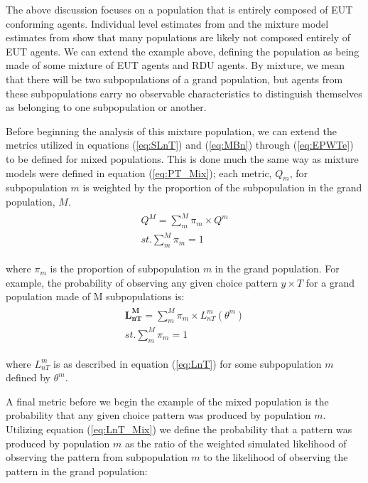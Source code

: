 \documentclass[../main.tex]{subfiles}
\begin{document}
The above discussion focuses on a population that is entirely composed of EUT conforming agents.
Individual level estimates from \textcite{Hey1994} and the mixture model estimates from \textcite{Harrison2008a} show that many populations are likely not composed entirely of EUT agents.
We can extend the example above, defining the population as being made of some mixture of EUT agents and RDU agents.
By mixture, we mean that there will be two subpopulations of a grand population, but agents from these subpopulations carry no observable characteristics to distinguish themselves as belonging to one subpopulation or another.

Before beginning the analysis of this mixture population, we can extend the metrics utilized in equations (\ref{eq:SLnT}) and (\ref{eq:MBn}) through (\ref{eq:EPWTe}) to be defined for mixed populations.
This is done much the same way as mixture models were defined in equation (\ref{eq:PT_Mix}); each metric, $Q_m$, for subpopulation $m$ is weighted by the proportion of the subpopulation in the grand population, $M$.
\begin{align}
	\label{eq:Metric_Mix}
	\begin{split}
		\bm{\mathit{Q^M}} = \sum_m^M \pi_m \times Q^m \\ 
		\mathit{st.} \sum_m^M \pi_m = 1
	\end{split}
\end{align}

\noindent where $\pi_m$ is the proportion of subpopulation $m$ in the grand population.
For example, the probability of observing any given choice pattern $y \times T$ for a grand population made of M subpopulations is:
\begin{align}
	\label{eq:LnT_Mix}
	\begin{split}
		\bm{L_{nT}^M} = \sum_m^M \pi_m \times L_{nT}^m(\theta^m) \\ 
		\mathit{st.} \sum_m^M \pi_m = 1
	\end{split}
\end{align}

\noindent where $L_{nT}^m$ is as described in equation (\ref{eq:LnT}) for some subpopulation $m$ defined by $\theta^m$.

A final metric before we begin the example of the mixed population is the probability that any given choice pattern was produced by population $m$.
Utilizing equation (\ref{eq:LnT_Mix}) we define the probability that a pattern was produced by population $m$ as the ratio of the weighted simulated likelihood of observing the pattern from subpopulation $m$ to the likelihood of observing the pattern in the grand population:
\end{document}

